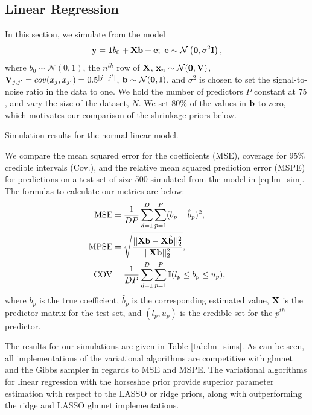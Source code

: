 \documentclass[]{article}
\newcommand{\V}[1]{{\bm{\mathbf{\MakeLowercase{#1}}}}} %
\newcommand{\M}[1]{{\bm{\mathbf{\MakeUppercase{#1}}}}} %
\def\b{{\bf b}}
\def\e{{\bf e}}
\def\I{{\bf I}}
\def\X{{\bf X}}
\def\x{{\bf x}}
\def\y{{\bf y}}
\newcommand{\normal}{\mathcal{N}}
\newcommand{\zerovec}{\V{0}}
\newcommand{\pkg}[1]{{\fontseries{b}\selectfont #1}}
\begin{document}
\subsection{Linear Regression} \label{sec:lm_sims}

In this section, we simulate from the model 
\begin{align} \label{eq:lm_sim}
	\y = \boldsymbol{1} b_0 + \X \b + \e; \ 
		\e \sim \normal \left( \boldsymbol{0}, \sigma^2 \I \right),
\end{align} 
where $b_0 \sim \normal(0, 1)$, the $n^{th}$ row of $\X$, $\x_n \sim
\normal(\zerovec, \M{V})$, $\M{V}_{j, j'} = cov(x_j, x_{j'}) = 0.5^{|j - j'|}$,
$\b \sim \normal(\zerovec, \I)$, and $\sigma^2$ is chosen to set the
signal-to-noise ratio in the data to one.  We hold the number of predictors $P$
constant at $75$, and vary the size of the dataset, $N$.  We set 80\% of the
values in $\b$ to zero, which motivates our comparison of the shrinkage priors
below. 

\begin{table}[t]
	\caption{Simulation results for the normal linear model.}	
	\label{tab:lm_sims}
	
\end{table}

We compare the mean squared error for the coefficients (MSE), coverage for 95\%
credible intervals (Cov.), and the relative mean squared prediction error (MSPE)
for predictions on a test set of size 500 simulated from the model in
\eqref{eq:lm_sim}. The formulas to calculate our metrics are below:
\begin{align*} 
\begin{split}
\text{MSE} & = \frac{1}{DP} \sum_{d = 1}^{D} \sum_{p = 1}^P 
(b_p - \hat{b}_p)^2, \\
\text{MPSE} & = \sqrt{\frac{||\X \b - \X \hat{\b}||^2_2}{ ||\X \b||^2_2}}, \\
\text{COV} & = \frac{1}{DP} \sum_{d = 1}^D \sum_{p = 1}^P
\mathbb{I}(l_p \leq b_p \leq u_p),
\end{split}
\end{align*}
where $b_p$ is the true coefficient, $\hat{b}_p$ is the corresponding estimated
value, $\X$ is the predictor matrix for the test set, and $(l_{p}, u_p)$ is the
credible set for the $p^{th}$ predictor. 

The results for our simulations are given in Table \ref{tab:lm_sims}. As can be
seen, all implementations of the variational algorithms are competitive with
\pkg{glmnet} and the Gibbs sampler in regards to MSE and MSPE. The variational
algorithms for linear regression with the horseshoe prior provide superior
parameter estimation with respect to the LASSO or ridge priors, along with
outperforming the ridge and LASSO \pkg{glmnet} implementations. 
\end{document}
